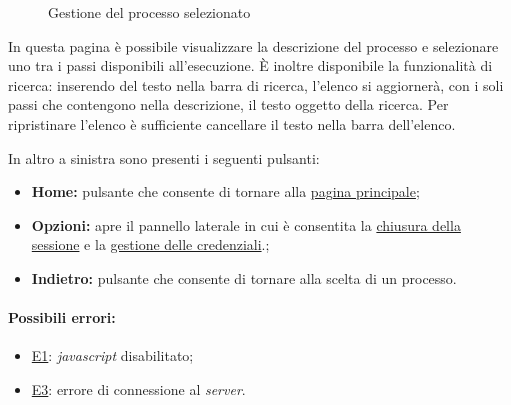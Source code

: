 \begin{figure}[H] \centering 
{} \caption{Gestione del processo selezionato}
\label{fig:Fprocess}
\end{figure}

In questa pagina è possibile visualizzare la descrizione del processo e selezionare uno tra i passi disponibili all'esecuzione. È inoltre disponibile la funzionalità di ricerca: inserendo del testo nella barra di ricerca, l'elenco si aggiornerà, con i soli passi che contengono nella descrizione, il testo oggetto della ricerca.
Per ripristinare l'elenco è sufficiente cancellare il testo nella barra dell'elenco.

In altro a sinistra sono presenti i seguenti pulsanti:
\begin{itemize}
\item \textbf{Home:} pulsante che consente di tornare alla \hyperref[home]{pagina principale};
\item \textbf{Opzioni:} apre il pannello laterale in cui è consentita la \hyperref[logout]{chiusura della sessione} e la \hyperref[userdata]{gestione delle credenziali}.;
\item \textbf{Indietro:} pulsante che consente di tornare alla scelta di un processo.
\end{itemize}

\paragraph*{Possibili errori:}
\begin{itemize}
\item \hyperref[e1]{E1}: \textit{javascript} disabilitato;
\item \hyperref[e3]{E3}: errore di connessione al \textit{server}.
\end{itemize}

